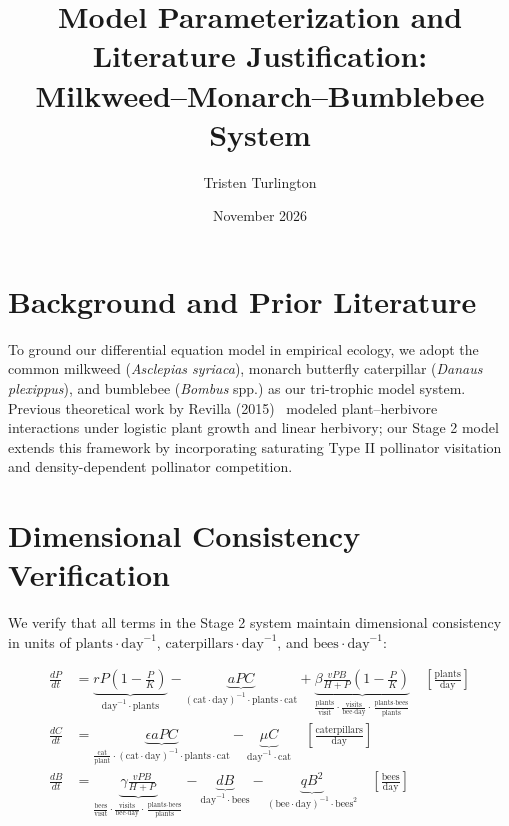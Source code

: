 \documentclass[11pt]{article}
\title{Model Parameterization and Literature Justification:\\Milkweed--Monarch--Bumblebee System}
\author{Tristen Turlington}
\date{November 2026}
\begin{document}
\maketitle

\section{Background and Prior Literature}
To ground our differential equation model in empirical ecology, we adopt the common milkweed (\textit{Asclepias syriaca}), monarch butterfly caterpillar (\textit{Danaus plexippus}), and bumblebee (\textit{Bombus} spp.) as our tri-trophic model system. Previous theoretical work by Revilla (2015)~\cite{revilla2015} modeled plant--herbivore interactions under logistic plant growth and linear herbivory; our Stage 2 model extends this framework by incorporating saturating Type II pollinator visitation and density-dependent pollinator competition.

\section{Dimensional Consistency Verification}
We verify that all terms in the Stage 2 system maintain dimensional consistency in units of $\text{plants}\cdot\text{day}^{-1}$, $\text{caterpillars}\cdot\text{day}^{-1}$, and $\text{bees}\cdot\text{day}^{-1}$:

\begin{align}
\frac{dP}{dt} &= \underbrace{rP\left(1-\frac{P}{K}\right)}_{\text{day}^{-1}\cdot\text{plants}} 
                 - \underbrace{aPC}_{(\text{cat}\cdot\text{day})^{-1}\cdot\text{plants}\cdot\text{cat}} 
                 + \underbrace{\beta \frac{vPB}{H+P}\left(1-\frac{P}{K}\right)}_{\frac{\text{plants}}{\text{visit}}\cdot\frac{\text{visits}}{\text{bee}\cdot\text{day}}\cdot\frac{\text{plants}\cdot\text{bees}}{\text{plants}}} 
                 \quad \left[\frac{\text{plants}}{\text{day}}\right] \\[6pt]
\frac{dC}{dt} &= \underbrace{\epsilon a P C}_{\frac{\text{cat}}{\text{plant}}\cdot(\text{cat}\cdot\text{day})^{-1}\cdot\text{plants}\cdot\text{cat}} 
                 - \underbrace{\mu C}_{\text{day}^{-1}\cdot\text{cat}} 
                 \quad \left[\frac{\text{caterpillars}}{\text{day}}\right] \\[6pt]
\frac{dB}{dt} &= \underbrace{\gamma \frac{vPB}{H+P}}_{\frac{\text{bees}}{\text{visit}}\cdot\frac{\text{visits}}{\text{bee}\cdot\text{day}}\cdot\frac{\text{plants}\cdot\text{bees}}{\text{plants}}} 
                 - \underbrace{dB}_{\text{day}^{-1}\cdot\text{bees}} 
                 - \underbrace{qB^2}_{(\text{bee}\cdot\text{day})^{-1}\cdot\text{bees}^2} 
                 \quad \left[\frac{\text{bees}}{\text{day}}\right]
\end{align}
\end{document}
